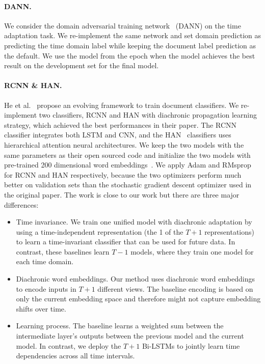 \paragraph{DANN.} 
We consider the domain adversarial training network~\cite{ganin2016domain} (DANN) on the time adaptation task. We re-implement the same network and set domain prediction as predicting the time domain label while keeping the document label prediction as the default. We use the model from the epoch when the model achieves the best result on the development set for the final model.

\paragraph{RCNN \& HAN.} 
He et al.~\cite{he2018time} propose an evolving framework to train document classifiers. We re-implement two classifiers, RCNN and HAN with diachronic propagation learning strategy, which achieved the best performances in their paper. The RCNN~\cite{lai2015recurrent} classifier integrates both LSTM and CNN, and the HAN~\cite{yang2016hierarchical} classifiers uses hierarchical attention neural architectures. We keep the two models with the same parameters as their open sourced code and initialize the two models with pre-trained 200 dimensional word embeddings~\cite{bojanowski2017enriching}. We apply Adam and RMsprop for RCNN and HAN respectively, because the two optimizers perform much better on validation sets than the stochastic gradient descent optimizer used in the original paper. The work is close to our work but there are three major differences:
\begin{itemize}
    \item Time invariance. We train one unified model with diachronic adaptation by using a time-independent representation (the 1 of the $T+1$ representations) to learn a time-invariant classifier that can be used for future data. In contrast, these baselines learn $T-1$ models, where they train one model for each time domain.
    \item Diachronic word embeddings. Our method uses diachronic word embeddings to encode inputs in $T+1$ different views. The baseline encoding is based on only the current embedding space and therefore might not capture embedding shifts over time.
    \item Learning process. The baseline learns a weighted sum between the intermediate layer's outputs between the previous model and the current model. In contrast, we deploy the $T+1$ Bi-LSTMs to jointly learn time dependencies across all time intervals. %
\end{itemize} 

